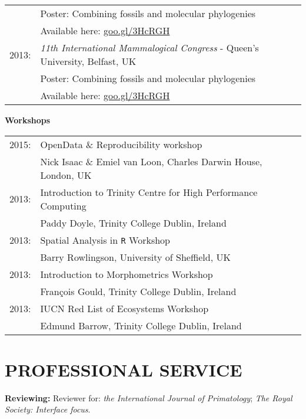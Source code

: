 \documentclass[10pt,a4paper]{article}
\begin{document}
{\begin{tabular}{ll}
& Poster: Combining fossils and molecular phylogenies\\
& Available here: \href{http://figshare.com/articles/Combining_fossils_and_molecular_phylogenies/1056300}{goo.gl/3HcRGH}\\
2013: & \textit{11th International Mammalogical Congress} - Queen's University, Belfast, UK \\
& Poster: Combining fossils and molecular phylogenies\\
& Available here: \href{http://figshare.com/articles/Combining_fossils_and_molecular_phylogenies/1056300}{goo.gl/3HcRGH}\\
\end{tabular}
\bigskip

\raggedright\textbf{Workshops}\\[1.5ex]
\begin{tabular}{ll}
2015: & OpenData \& Reproducibility workshop\\
& Nick Isaac \& Emiel van Loon, Charles Darwin House, London, UK\\
2013: & Introduction to Trinity Centre for High Performance Computing\\
& Paddy Doyle, Trinity College Dublin, Ireland\\
2013: & Spatial Analysis in \texttt{R} Workshop\\
& Barry Rowlingson, University of Sheffield, UK\\
2013: & Introduction to Morphometrics Workshop\\
& Fran\c{c}ois Gould, Trinity College Dublin, Ireland\\
2013: & IUCN Red List of Ecosystems Workshop\\
& Edmund Barrow, Trinity College Dublin, Ireland\\


\end{tabular}
\bigskip


\section{PROFESSIONAL SERVICE}
\raggedright\textbf{Reviewing:}
Reviewer for: \textit{the International Journal of Primatology}; \textit{The Royal Society: Interface focus}.
\bigskip

}
\end{document}
